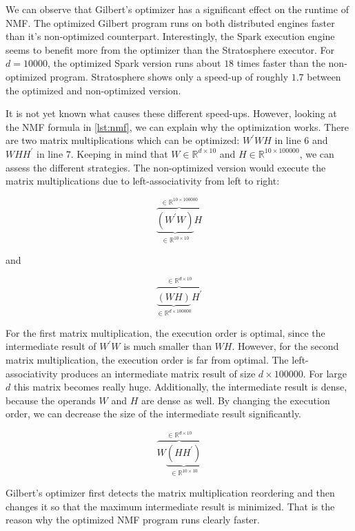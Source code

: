 We can observe that Gilbert's optimizer has a significant effect on the runtime of NMF.
The optimized Gilbert program runs on both distributed engines faster than it's non-optimized counterpart.
Interestingly, the Spark execution engine seems to benefit more from the optimizer than the Stratosphere executor.
For $d=10000$, the optimized Spark version runs about $18$ times faster than the non-optimized program.
Stratosphere shows only a speed-up of roughly $1.7$ between the optimized and non-optimized version.

It is not yet known what causes these different speed-ups.
However, looking at the NMF formula in \cref{lst:nmf}, we can explain why the optimization works.
There are two matrix multiplications which can be optimized: $W^\prime WH$ in line $6$ and $WHH^\prime$ in line $7$.
Keeping in mind that $W\in \mathbb{R}^{d\times 10}$ and $H\in \mathbb{R}^{10 \times 100000}$, we can assess the different strategies.
The non-optimized version would execute the matrix multiplications due to left-associativity from left to right:

\begin{displaymath}
	\overbrace{\underbrace{\left(W^\prime W\right)}_{\in \mathbb{R}^{10\times 10}}H}^{\in\mathbb{R}^{10\times 100000}}
\end{displaymath}

and

\begin{displaymath}
	\overbrace{\underbrace{\left(WH\right)}_{\in \mathbb{R}^{d \times 100000}}H^\prime}^{\in \mathbb{R}^{d\times 10}}
\end{displaymath}

For the first matrix multiplication, the execution order is optimal, since the intermediate result of $W^\prime W$ is much smaller than $WH$.
However, for the second matrix multiplication, the execution order is far from optimal.
The left-associativity produces an intermediate matrix result of size $d\times 100000$.
For large $d$ this matrix becomes really huge.
Additionally, the intermediate result is dense, because the operands $W$ and $H$ are dense as well.
By changing the execution order, we can decrease the size of the intermediate result significantly.

\begin{displaymath}
	\overbrace{W\underbrace{\left(HH^\prime\right)}_{\in \mathbb{R}^{10 \times 10}}}^{\in \mathbb{R}^{d\times 10}}
\end{displaymath}

Gilbert's optimizer first detects the matrix multiplication reordering and then changes it so that the maximum intermediate result is minimized.
That is the reason why the optimized NMF program runs clearly faster.

